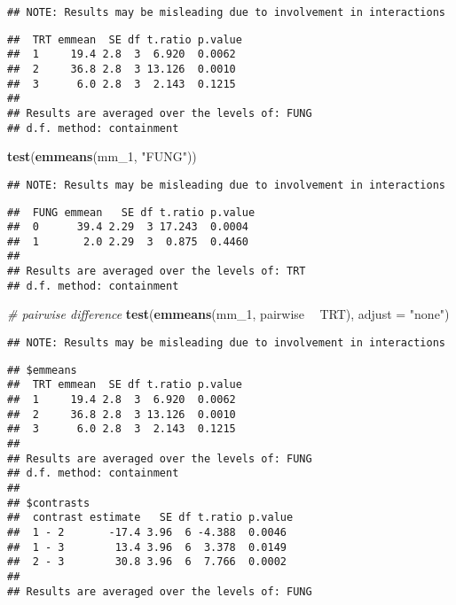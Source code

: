 \documentclass[]{book}
\newenvironment{Shaded}{\begin{snugshade}}{\end{snugshade}}
\newcommand{\CommentTok}[1]{\textcolor[rgb]{0.56,0.35,0.01}{\textit{#1}}}
\newcommand{\DataTypeTok}[1]{\textcolor[rgb]{0.13,0.29,0.53}{#1}}
\newcommand{\DecValTok}[1]{\textcolor[rgb]{0.00,0.00,0.81}{#1}}
\newcommand{\KeywordTok}[1]{\textcolor[rgb]{0.13,0.29,0.53}{\textbf{#1}}}
\newcommand{\NormalTok}[1]{#1}
\newcommand{\OperatorTok}[1]{\textcolor[rgb]{0.81,0.36,0.00}{\textbf{#1}}}
\newcommand{\StringTok}[1]{\textcolor[rgb]{0.31,0.60,0.02}{#1}}
\begin{document}
\begin{verbatim}
## NOTE: Results may be misleading due to involvement in interactions
\end{verbatim}

\begin{verbatim}
##  TRT emmean  SE df t.ratio p.value
##  1     19.4 2.8  3  6.920  0.0062 
##  2     36.8 2.8  3 13.126  0.0010 
##  3      6.0 2.8  3  2.143  0.1215 
## 
## Results are averaged over the levels of: FUNG 
## d.f. method: containment
\end{verbatim}

\begin{Shaded}
\begin{Highlighting}[]
\KeywordTok{test}\NormalTok{(}\KeywordTok{emmeans}\NormalTok{(mm_}\DecValTok{1}\NormalTok{, }\StringTok{"FUNG"}\NormalTok{))}
\end{Highlighting}
\end{Shaded}

\begin{verbatim}
## NOTE: Results may be misleading due to involvement in interactions
\end{verbatim}

\begin{verbatim}
##  FUNG emmean   SE df t.ratio p.value
##  0      39.4 2.29  3 17.243  0.0004 
##  1       2.0 2.29  3  0.875  0.4460 
## 
## Results are averaged over the levels of: TRT 
## d.f. method: containment
\end{verbatim}

\begin{Shaded}
\begin{Highlighting}[]
\CommentTok{# pairwise difference}
\KeywordTok{test}\NormalTok{(}\KeywordTok{emmeans}\NormalTok{(mm_}\DecValTok{1}\NormalTok{, pairwise }\OperatorTok{~}\StringTok{ }\NormalTok{TRT), }\DataTypeTok{adjust =} \StringTok{"none"}\NormalTok{)}
\end{Highlighting}
\end{Shaded}

\begin{verbatim}
## NOTE: Results may be misleading due to involvement in interactions
\end{verbatim}

\begin{verbatim}
## $emmeans
##  TRT emmean  SE df t.ratio p.value
##  1     19.4 2.8  3  6.920  0.0062 
##  2     36.8 2.8  3 13.126  0.0010 
##  3      6.0 2.8  3  2.143  0.1215 
## 
## Results are averaged over the levels of: FUNG 
## d.f. method: containment 
## 
## $contrasts
##  contrast estimate   SE df t.ratio p.value
##  1 - 2       -17.4 3.96  6 -4.388  0.0046 
##  1 - 3        13.4 3.96  6  3.378  0.0149 
##  2 - 3        30.8 3.96  6  7.766  0.0002 
## 
## Results are averaged over the levels of: FUNG
\end{verbatim}
\end{document}

